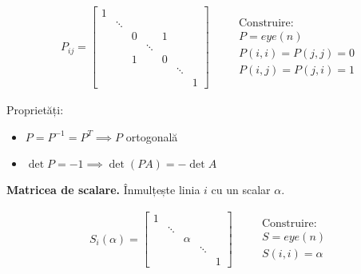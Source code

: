 \documentclass{exam}
\begin{document}
\begin{equation*}
	\begin{split}
		P_{ij} = \begin{bmatrix}
			         1 &        &   &        &   &        &   \\
			           & \ddots &   &        &   &        &   \\
			           &        & 0 &        & 1 &        &   \\
			           &        &   & \ddots &   &        &   \\
			           &        & 1 &        & 0 &        &   \\
			           &        &   &        &   & \ddots &   \\
			           &        &   &        &   &        & 1
		         \end{bmatrix}
	\end{split}
	\quad
	\begin{split}
		 & \text{Construire:}      \\
		 & P = eye(n)              \\
		 & P (i, i) = P (j, j) = 0 \\
		 & P (i, j) = P (j, i) = 1
	\end{split}
\end{equation*}

\par Proprietăți:
\begin{itemize}
	\item $P = P^{-1} = P^T \implies P$ ortogonală
	\item $\det P = -1 \implies \det (PA) = -\det A$
\end{itemize}

\par \textbf{Matricea de scalare.} Înmulțește linia $i$ cu un scalar $\alpha$.

\begin{equation*}
	\begin{split}
		S_{i}(\alpha) = \begin{bmatrix}
			                1 &        &        &        &   \\
			                  & \ddots &        &        &   \\
			                  &        & \alpha &        &   \\
			                  &        &        & \ddots &   \\
			                  &        &        &        & 1
		                \end{bmatrix}
	\end{split}
	\quad
	\begin{split}
		 & \text{Construire:} \\
		 & S = eye(n)         \\
		 & S (i, i) = \alpha
	\end{split}
\end{equation*}
\end{document}
